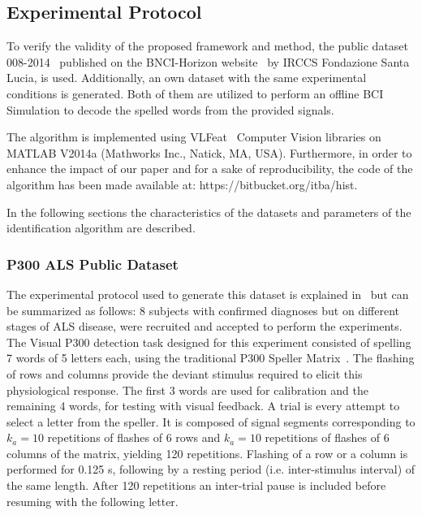 \documentclass[utf8]{frontiersSCNS} %
\begin{document}
\subsection{Experimental Protocol} \label{Protocol}

To verify the validity of the proposed framework and method, the public dataset 008-2014~\citep{Riccio2013} published on the BNCI-Horizon website~\citep{Brunner2014} by  IRCCS Fondazione Santa Lucia, is used. Additionally, an own dataset with the same experimental conditions is generated. Both of them are utilized to perform an offline BCI Simulation to decode the spelled words from the provided signals. 

The algorithm is implemented using  VLFeat~\citep{Vedaldi2010} Computer Vision libraries on MATLAB V2014a (Mathworks Inc., Natick, MA, USA). Furthermore, in order to enhance the impact of our paper and for a sake of reproducibility, the code of the algorithm has been made available at: https://bitbucket.org/itba/hist.

In the following sections the characteristics of the datasets and parameters of the identification algorithm are described. 


\subsubsection{P300 ALS Public Dataset} \label{ALSDataset}

The experimental protocol used to generate this dataset is explained in~\citep{Riccio2013} but can be summarized as follows:  8 subjects with confirmed diagnoses but on different stages of ALS disease, were recruited and accepted to perform the experiments. The Visual P300 detection task designed for this experiment consisted of spelling 7 words of 5 letters each, using the traditional P300 Speller Matrix~\citep{Farwell1988}. The flashing of rows and columns provide the deviant stimulus required to elicit this physiological response.  The first 3 words are used for calibration and the remaining 4 words, for testing with visual feedback.  A trial is every attempt to select a letter from the speller. It is composed of signal segments corresponding to $k_a =10$ repetitions of flashes of 6 rows and $k_a =10$ repetitions of flashes of 6 columns of the matrix, yielding 120 repetitions.  Flashing of a row or a column is performed for 0.125 s, following by a resting period (i.e. inter-stimulus interval) of the same length.  After 120 repetitions an inter-trial pause is included before resuming with the following letter.
\end{document}
